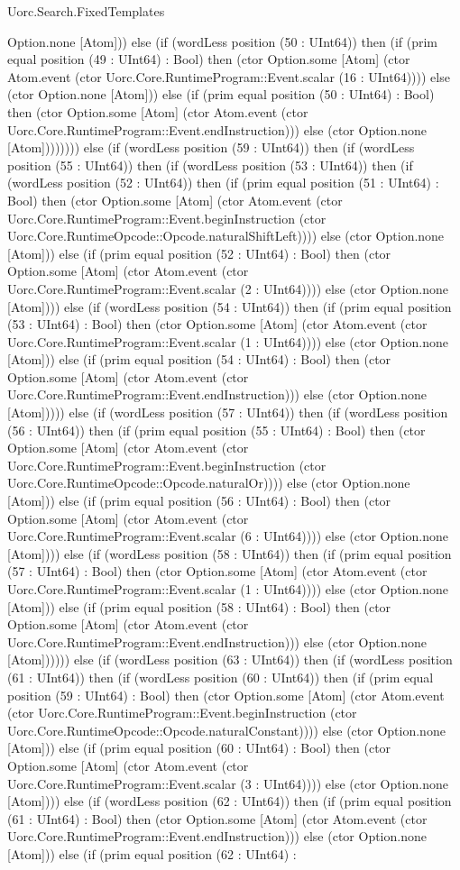 \begin{lexlean}{Uorc.Search.FixedTemplates}
\begin{semanticmodule}
{Option.none [Atom])) else (if (wordLess position (50 : UInt64)) then (if (prim equal position (49 : UInt64) : Bool) then (ctor Option.some [Atom] (ctor Atom.event (ctor Uorc.Core.RuntimeProgram::Event.scalar (16 : UInt64)))) else (ctor Option.none [Atom])) else (if (prim equal position (50 : UInt64) : Bool) then (ctor Option.some [Atom] (ctor Atom.event (ctor Uorc.Core.RuntimeProgram::Event.endInstruction))) else (ctor Option.none [Atom]))))))) else (if (wordLess position (59 : UInt64)) then (if (wordLess position (55 : UInt64)) then (if (wordLess position (53 : UInt64)) then (if (wordLess position (52 : UInt64)) then (if (prim equal position (51 : UInt64) : Bool) then (ctor Option.some [Atom] (ctor Atom.event (ctor Uorc.Core.RuntimeProgram::Event.beginInstruction (ctor Uorc.Core.RuntimeOpcode::Opcode.naturalShiftLeft)))) else (ctor Option.none [Atom])) else (if (prim equal position (52 : UInt64) : Bool) then (ctor Option.some [Atom] (ctor Atom.event (ctor Uorc.Core.RuntimeProgram::Event.scalar (2 : UInt64)))) else (ctor Option.none [Atom]))) else (if (wordLess position (54 : UInt64)) then (if (prim equal position (53 : UInt64) : Bool) then (ctor Option.some [Atom] (ctor Atom.event (ctor Uorc.Core.RuntimeProgram::Event.scalar (1 : UInt64)))) else (ctor Option.none [Atom])) else (if (prim equal position (54 : UInt64) : Bool) then (ctor Option.some [Atom] (ctor Atom.event (ctor Uorc.Core.RuntimeProgram::Event.endInstruction))) else (ctor Option.none [Atom])))) else (if (wordLess position (57 : UInt64)) then (if (wordLess position (56 : UInt64)) then (if (prim equal position (55 : UInt64) : Bool) then (ctor Option.some [Atom] (ctor Atom.event (ctor Uorc.Core.RuntimeProgram::Event.beginInstruction (ctor Uorc.Core.RuntimeOpcode::Opcode.naturalOr)))) else (ctor Option.none [Atom])) else (if (prim equal position (56 : UInt64) : Bool) then (ctor Option.some [Atom] (ctor Atom.event (ctor Uorc.Core.RuntimeProgram::Event.scalar (6 : UInt64)))) else (ctor Option.none [Atom]))) else (if (wordLess position (58 : UInt64)) then (if (prim equal position (57 : UInt64) : Bool) then (ctor Option.some [Atom] (ctor Atom.event (ctor Uorc.Core.RuntimeProgram::Event.scalar (1 : UInt64)))) else (ctor Option.none [Atom])) else (if (prim equal position (58 : UInt64) : Bool) then (ctor Option.some [Atom] (ctor Atom.event (ctor Uorc.Core.RuntimeProgram::Event.endInstruction))) else (ctor Option.none [Atom]))))) else (if (wordLess position (63 : UInt64)) then (if (wordLess position (61 : UInt64)) then (if (wordLess position (60 : UInt64)) then (if (prim equal position (59 : UInt64) : Bool) then (ctor Option.some [Atom] (ctor Atom.event (ctor Uorc.Core.RuntimeProgram::Event.beginInstruction (ctor Uorc.Core.RuntimeOpcode::Opcode.naturalConstant)))) else (ctor Option.none [Atom])) else (if (prim equal position (60 : UInt64) : Bool) then (ctor Option.some [Atom] (ctor Atom.event (ctor Uorc.Core.RuntimeProgram::Event.scalar (3 : UInt64)))) else (ctor Option.none [Atom]))) else (if (wordLess position (62 : UInt64)) then (if (prim equal position (61 : UInt64) : Bool) then (ctor Option.some [Atom] (ctor Atom.event (ctor Uorc.Core.RuntimeProgram::Event.endInstruction))) else (ctor Option.none [Atom])) else (if (prim equal position (62 : UInt64) : }
\end{semanticmodule}
\end{lexlean}
